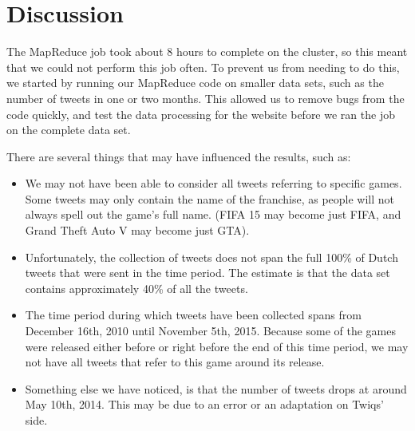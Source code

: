 \section{Discussion}
The MapReduce job took about 8 hours to complete on the cluster, so this meant that we could not perform this job often. To prevent us from needing to do this, we started by running our MapReduce code on smaller data sets, such as the number of tweets in one or two months. This allowed us to remove bugs from the code quickly, and test the data processing for the website before we ran the job on the complete data set.

There are several things that may have influenced the results, such as:
\begin{itemize}
	\item We may not have been able to consider all tweets referring to specific games. Some tweets may only contain the name of the franchise, as people will not always spell out the game's full name. (FIFA 15 may become just FIFA, and Grand Theft Auto V may become just GTA).
	\item Unfortunately, the collection of tweets does not span the full 100\% of Dutch tweets that were sent in the time period. The estimate is that the data set contains approximately 40\% of all the tweets. \cite{sangDealingWithBigData}
	\item The time period during which tweets have been collected spans from December 16th, 2010 until November 5th, 2015. Because some of the games were released either before or right before the end of this time period, we may not have all tweets that refer to this game around its release.
	\item Something else we have noticed, is that the number of tweets drops at around May 10th, 2014. This may be due to an error or an adaptation on Twiqs' side.
\end{itemize}